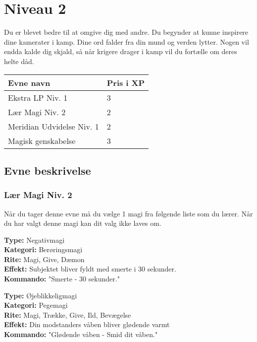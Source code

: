\chapter{Niveau 2}
Du er blevet bedre til at omgive dig med andre. Du begynder at kunne inspirere dine kamerater i kamp. Dine ord falder fra din mund og verden lytter. Nogen vil endda kalde dig skjald, så når krigere drager i kamp vil du fortælle om deres helte dåd.
\begin{table}[H]
    \centering
    \begin{tabular}{|p{}|p{}|}
    \rowcolor{cerulean!80}\hline
    Evne navn & Pris i XP \\\hline
       Ekstra LP Niv. 1 & 3 \\\hline
       Lær Magi Niv. 2 & 2 \\\hline
       Meridian Udvidelse Niv. 1 & 2 \\\hline
       Magisk genskabelse & 3 \\\hline
    \end{tabular}
\end{table}
\section{Evne beskrivelse}



\subsection{Lær Magi Niv. 2}
Når du tager denne evne må du vælge 1 magi fra følgende liste som du lærer. Når du har valgt denne magi kan dit valg ikke laves om.

\begin{lærmagi*}[Smerte]
\textbf{Type:} Negativmagi\\
\textbf{Kategori:} Berøringsmagi\\
\textbf{Rite:} Magi, Give, Dæmon\\
\textbf{Effekt:} Subjektet bliver fyldt med smerte i 30 sekunder.\\
\textbf{Kommando:} "Smerte - 30 sekunder."\\
\end{lærmagi*}

\begin{lærmagi*}
\textbf{Type:} Øjeblikkeligmagi\\
\textbf{Kategori:} Pegemagi\\
\textbf{Rite:} Magi, Trække, Give, Ild, Bevægelse\\
\textbf{Effekt:} Din modstanders våben bliver glødende varmt\\
\textbf{Kommando:} "Glødende våben - Smid dit våben."\\
\end{lærmagi*}

